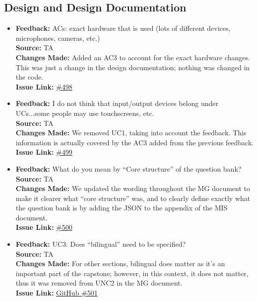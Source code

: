\documentclass{article}
\begin{document}
\subsection{Design and Design Documentation}
\begin{itemize}

    \item 
      \textbf{Feedback:} ACs: exact hardware that is used (lots of different devices, microphones, cameras, etc.) \\
      \textbf{Source:} TA \\
      \textbf{Changes Made:} Added an AC3 to account for the exact hardware changes. This was just a change in the design documentation; nothing was changed in the code. \\
      \textbf{Issue Link:} \href{https://github.com/parishanizam/TeleHealth/issues/498}{\#498}
    
    \item
      \textbf{Feedback:} I do not think that input/output devices belong under UCs...some people may use touchscreens, etc. \\
      \textbf{Source:} TA \\
      \textbf{Changes Made:} We removed UC1, taking into account the feedback. This information is actually covered by the AC3 added from the previous feedback. \\
      \textbf{Issue Link:} \href{https://github.com/parishanizam/TeleHealth/issues/499}{\#499}
    
    \item
      \textbf{Feedback:} What do you mean by “Core structure” of the question bank? \\
      \textbf{Source:} TA \\
      \textbf{Changes Made:} We updated the wording throughout the MG document to make it clearer what “core structure” was, and to clearly define exactly what the question bank is by adding the JSON to the appendix of the MIS document. \\
      \textbf{Issue Link:} \href{https://github.com/parishanizam/TeleHealth/issues/500}{\#500}
    
    \item
      \textbf{Feedback:} UC3: Does “bilingual” need to be specified? \\
      \textbf{Source:} TA \\
      \textbf{Changes Made:} For other sections, bilingual does matter as it’s an important part of the capstone; however, in this context, it does not matter, thus it was removed from UNC2 in the MG document. \\
      \textbf{Issue Link:} \href{https://github.com/parishanizam/TeleHealth/issues/501}{GitHub \#501}
    

\end{itemize}
\end{document}
